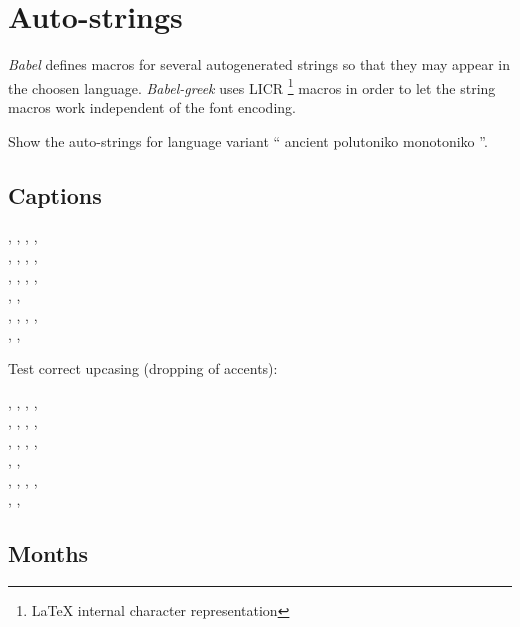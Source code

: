 \documentclass[a4paper]{article}
\newcommand{\GreekLanguageVariant}{%
  \ifx\captionsgreek\captionspolutonikogreek
    \ifx\captionsgreek\captionsancientgreek
      ancient%
    \else
      polutoniko%
    \fi
  \else
    monotoniko%
  \fi
}
\begin{document}
\section{Auto-strings}

\emph{Babel} defines macros for several autogenerated strings so that they
may appear in the choosen language. \emph{Babel-greek} uses LICR%
\footnote{LaTeX internal character representation} macros in
order to let the string macros work independent of the font encoding.

\begin{abstract}
   \today.
\end{abstract}

Show the auto-strings for language variant ``\GreekLanguageVariant''.

\subsection{Captions}

\newcommand{\AutoStrings}{%
  \abstractname,
  \alsoname,
  \appendixname,
  \bibname,\\
  \ccname,
  \chaptername,
  \contentsname,
  \enclname,\\
  \figurename,
  \glossaryname,
  \headtoname,
  \indexname,\\
  \listfigurename ,
  \listtablename,\\
  \pagename,
  \partname,
  \prefacename,
  \proofname,\\
  \refname,
  \seename,
  \tablename
}
\AutoStrings
{}

Test correct upcasing (dropping of accents):

\MakeUppercase{\AutoStrings}

\subsection{Months}
\end{document}
